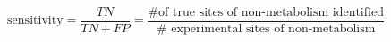 \begin{equation}
\mathrm{sensitivity} = \frac{TN}{TN + FP} = \frac{\text{\# of true sites of non-metabolism identified}}{\text{\#\ experimental\ sites\ of\ non-metabolism}}
\end{equation}
